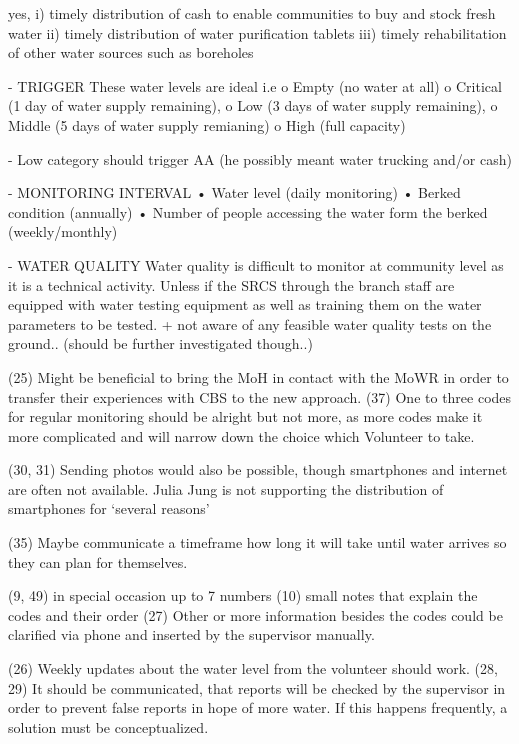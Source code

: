 yes, i) timely distribution of cash to enable communities to buy and stock fresh water
ii) timely distribution of water purification tablets
iii) timely rehabilitation of other water sources such as boreholes

- TRIGGER
These water levels are ideal i.e 
o	Empty (no water at all) 
o	Critical (1 day of water supply remaining), 
o	Low (3 days of water supply remaining), 
o	Middle (5 days of water supply remianing) 
o	High (full capacity)

-	Low category should trigger AA (he possibly meant water trucking and/or cash)

- MONITORING INTERVAL
•	Water level (daily monitoring)
•	Berked condition (annually)
•	Number of people accessing the water form the berked (weekly/monthly)

- WATER QUALITY
Water quality is difficult to monitor at community level as it is a technical activity. Unless if the SRCS through the branch staff are equipped with water testing equipment as well as training them on the water parameters to be tested.
+ not aware of any feasible water quality tests on the ground.. (should be further investigated though..)



(25) Might be beneficial to bring the MoH in contact with the MoWR in order to transfer their experiences with CBS to the new approach.
(37) One to three codes for regular monitoring should be alright but not more, as more codes make it more complicated and will narrow down the choice which Volunteer to take. 

(30, 31) Sending photos would also be possible, though smartphones and internet are often not available. Julia Jung is not supporting the distribution of smartphones for ‘several reasons’

(35) Maybe communicate a timeframe how long it will take until water arrives so they can plan for themselves.

(9, 49) in special occasion up to 7 numbers
(10) small notes that explain the codes and their order
(27) Other or more information besides the codes could be clarified via phone and inserted by the supervisor manually.

(26) Weekly updates about the water level from the volunteer should work.
(28, 29) It should be communicated, that reports will be checked by the supervisor in order to prevent false reports in hope of more water. If this happens frequently, a solution must be conceptualized.

